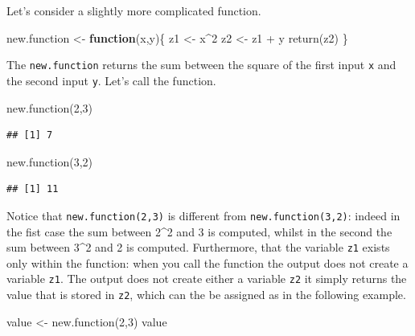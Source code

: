 \documentclass[
]{book}
\newenvironment{Shaded}{\begin{snugshade}}{\end{snugshade}}
\newcommand{\ControlFlowTok}[1]{\textcolor[rgb]{0.13,0.29,0.53}{\textbf{#1}}}
\newcommand{\DecValTok}[1]{\textcolor[rgb]{0.00,0.00,0.81}{#1}}
\newcommand{\FunctionTok}[1]{\textcolor[rgb]{0.00,0.00,0.00}{#1}}
\newcommand{\NormalTok}[1]{#1}
\newcommand{\OtherTok}[1]{\textcolor[rgb]{0.56,0.35,0.01}{#1}}
\newcommand{\SpecialCharTok}[1]{\textcolor[rgb]{0.00,0.00,0.00}{#1}}
\begin{document}
Let's consider a slightly more complicated function.

\begin{Shaded}
\begin{Highlighting}[]
\NormalTok{new.function }\OtherTok{\textless{}{-}} \ControlFlowTok{function}\NormalTok{(x,y)\{}
\NormalTok{  z1 }\OtherTok{\textless{}{-}}\NormalTok{ x}\SpecialCharTok{\^{}}\DecValTok{2}
\NormalTok{  z2 }\OtherTok{\textless{}{-}}\NormalTok{ z1 }\SpecialCharTok{+}\NormalTok{ y}
  \FunctionTok{return}\NormalTok{(z2)}
\NormalTok{\}}
\end{Highlighting}
\end{Shaded}

The \texttt{new.function} returns the sum between the square of the first input \texttt{x} and the second input \texttt{y}. Let's call the function.

\begin{Shaded}
\begin{Highlighting}[]
\FunctionTok{new.function}\NormalTok{(}\DecValTok{2}\NormalTok{,}\DecValTok{3}\NormalTok{)}
\end{Highlighting}
\end{Shaded}

\begin{verbatim}
## [1] 7
\end{verbatim}

\begin{Shaded}
\begin{Highlighting}[]
\FunctionTok{new.function}\NormalTok{(}\DecValTok{3}\NormalTok{,}\DecValTok{2}\NormalTok{)}
\end{Highlighting}
\end{Shaded}

\begin{verbatim}
## [1] 11
\end{verbatim}

Notice that \texttt{new.function(2,3)} is different from \texttt{new.function(3,2)}: indeed in the fist case the sum between 2\^{}2 and 3 is computed, whilst in the second the sum between 3\^{}2 and 2 is computed. Furthermore, that the variable \texttt{z1} exists only within the function: when you call the function the output does not create a variable \texttt{z1}. The output does not create either a variable \texttt{z2} it simply returns the value that is stored in \texttt{z2}, which can the be assigned as in the following example.

\begin{Shaded}
\begin{Highlighting}[]
\NormalTok{value }\OtherTok{\textless{}{-}} \FunctionTok{new.function}\NormalTok{(}\DecValTok{2}\NormalTok{,}\DecValTok{3}\NormalTok{)}
\NormalTok{value}
\end{Highlighting}
\end{Shaded}
\end{document}
